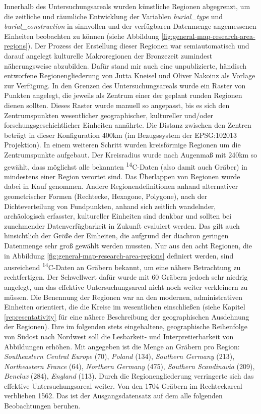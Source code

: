 \documentclass[openany,twoside,twocolumn]{book}
\begin{document}
Innerhalb des Untersuchungsareals wurden künstliche Regionen abgegrenzt,
um die zeitliche und räumliche Entwicklung der Variablen
\emph{burial\_type} und \emph{burial\_construction} in sinnvollen und
der verfügbaren Datenmenge angemessenen Einheiten beobachten zu können
(siehe Abbildung \ref{fig:general-map-research-area-regions}). Der
Prozess der Erstellung dieser Regionen war semiautomatisch und darauf
angelegt kulturelle Makroregionen der Bronzezeit zumindest
näherungsweise abzubilden. Dafür stand mir auch eine unpublizierte,
händisch entworfene Regionengliederung von Jutta Kneisel und Oliver
Nakoinz als Vorlage zur Verfügung. In den Grenzen des
Untersuchungsareals wurde ein Raster von Punkten angelegt, die jeweils
als Zentrum einer der geplant runden Regionen dienen sollten. Dieses
Raster wurde manuell so angepasst, bis es sich den Zentrumspunkten
wesentlicher geographischer, kultureller und/oder
forschungsgeschichtlicher Einheiten annährte. Die Distanz zwischen den
Zentren beträgt in dieser Konfiguration 400km (im Bezugssystem der
EPSG:102013 Projektion). In einem weiteren Schritt wurden kreisförmige
Regionen um die Zentrumspunkte aufgebaut. Der Kreisradius wurde nach
Augenmaß mit 240km so gewählt, dass möglichst alle bekannten
\textsuperscript{14}C-Daten (also damit auch Gräber) in mindestens einer
Region verortet sind. Das Überlappen von Regionen wurde dabei in Kauf
genommen. Andere Regionendefinitionen anhand alternativer geometrischer
Formen (Rechtecke, Hexagone, Polygone), nach der Dichteverteilung von
Fundpunkten, anhand sich zeitlich wandelnder, archäologisch erfasster,
kultureller Einheiten sind denkbar und sollten bei zunehmender
Datenverfügbarkeit in Zukunft evaluiert werden. Das gilt auch
hinsichtlich der Größe der Einheiten, die aufgrund der diachron geringen
Datenmenge sehr groß gewählt werden mussten. Nur aus den acht Regionen,
die in Abbildung \ref{fig:general-map-research-area-regions} definiert
werden, sind ausreichend \textsuperscript{14}C-Daten an Gräbern bekannt,
um eine nähere Betrachtung zu rechtfertigen. Der Schwellwert dafür wurde
mit 60 Gräbern jedoch sehr niedrig angelegt, um das effektive
Untersuchungsareal nicht noch weiter verkleinern zu müssen. Die
Benennung der Regionen war an den modernen, administrativen Einheiten
orientiert, die die Kreise im wesentlichen einschließen (siehe Kapitel
\ref{representativity} für eine nähere Beschreibung der geographischen
Ausdehnung der Regionen). Ihre im folgenden stets eingehaltene,
geographische Reihenfolge von Südost nach Nordwest soll die Lesbarkeit-
und Interpretierbarkeit von Abbildungen erhöhen. Mit angegeben ist die
Menge an Gräbern pro Region: \emph{Southeastern Central Europe} (70),
\emph{Poland} (134), \emph{Southern Germany} (213), \emph{Northeastern
France} (64), \emph{Northern Germany} (475), \emph{Southern Scandinavia}
(209), \emph{Benelux} (284), \emph{England} (113). Durch die
Regionengliederung verringerte sich das effektive Untersuchungsareal
weiter. Von den 1704 Gräbern im Rechteckareal verblieben 1562. Das ist
der Ausgangsdatensatz auf dem alle folgenden Beobachtungen beruhen.
\end{document}
